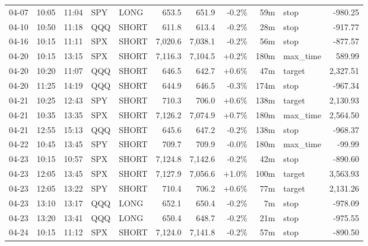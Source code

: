 \documentclass[11pt,a4paper,twoside]{article}
\begin{document}
\begin{center}
\begin{longtable}{>{\color{txtmain}}l l l l l r r r r >{\color{txtmain}}l r}
04-07 & 10:05 & 11:04 & SPY & LONG & 653.5 & 651.9 & \textcolor{lossred}{-0.2\%} & 59m & stop & \textcolor{lossred}{-980.25} \\
04-10 & 10:50 & 11:18 & QQQ & SHORT & 611.8 & 613.4 & \textcolor{lossred}{-0.2\%} & 28m & stop & \textcolor{lossred}{-917.77} \\
04-16 & 10:15 & 11:11 & SPX & SHORT & 7,020.6 & 7,038.1 & \textcolor{lossred}{-0.2\%} & 56m & stop & \textcolor{lossred}{-877.57} \\
04-20 & 10:15 & 13:15 & SPX & SHORT & 7,116.3 & 7,104.5 & \textcolor{wingreen}{+0.2\%} & 180m & max\_time & \textcolor{wingreen}{589.99} \\
04-20 & 10:20 & 11:07 & QQQ & SHORT & 646.5 & 642.7 & \textcolor{wingreen}{+0.6\%} & 47m & target & \textcolor{wingreen}{2,327.51} \\
04-20 & 11:25 & 14:19 & QQQ & SHORT & 644.9 & 646.5 & \textcolor{lossred}{-0.3\%} & 174m & stop & \textcolor{lossred}{-967.34} \\
04-21 & 10:25 & 12:43 & SPY & SHORT & 710.3 & 706.0 & \textcolor{wingreen}{+0.6\%} & 138m & target & \textcolor{wingreen}{2,130.93} \\
04-21 & 10:35 & 13:35 & SPX & SHORT & 7,126.2 & 7,074.9 & \textcolor{wingreen}{+0.7\%} & 180m & max\_time & \textcolor{wingreen}{2,564.50} \\
04-21 & 12:55 & 15:13 & QQQ & SHORT & 645.6 & 647.2 & \textcolor{lossred}{-0.2\%} & 138m & stop & \textcolor{lossred}{-968.37} \\
04-22 & 10:45 & 13:45 & SPY & SHORT & 709.7 & 709.9 & \textcolor{lossred}{-0.0\%} & 180m & max\_time & \textcolor{lossred}{-99.99} \\
04-23 & 10:15 & 10:57 & SPX & SHORT & 7,124.8 & 7,142.6 & \textcolor{lossred}{-0.2\%} & 42m & stop & \textcolor{lossred}{-890.60} \\
04-23 & 12:05 & 13:45 & SPX & SHORT & 7,127.9 & 7,056.6 & \textcolor{wingreen}{+1.0\%} & 100m & target & \textcolor{wingreen}{3,563.93} \\
04-23 & 12:05 & 13:22 & SPY & SHORT & 710.4 & 706.2 & \textcolor{wingreen}{+0.6\%} & 77m & target & \textcolor{wingreen}{2,131.26} \\
04-23 & 13:10 & 13:17 & QQQ & LONG & 652.1 & 650.4 & \textcolor{lossred}{-0.2\%} & 7m & stop & \textcolor{lossred}{-978.09} \\
04-23 & 13:20 & 13:41 & QQQ & LONG & 650.4 & 648.7 & \textcolor{lossred}{-0.2\%} & 21m & stop & \textcolor{lossred}{-975.55} \\
04-24 & 10:15 & 11:12 & SPX & SHORT & 7,124.0 & 7,141.8 & \textcolor{lossred}{-0.2\%} & 57m & stop & \textcolor{lossred}{-890.50} \\

\end{longtable}
\end{center}
\end{document}
